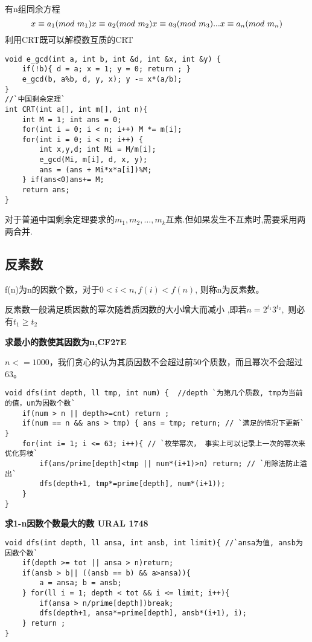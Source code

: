 有n组同余方程
$$
x \equiv a_1 (mod \ m_1) \\ x \equiv a_2 (mod \ m_2) \\ x \equiv a_3 (mod \ m_3) \\ ... \\ x \equiv a_n (mod \ m_n) \\ 
$$
利用CRT既可以解模数互质的CRT
\begin{lstlisting}
void e_gcd(int a, int b, int &d, int &x, int &y) {
    if(!b){ d = a; x = 1; y = 0; return ; }
    e_gcd(b, a%b, d, y, x); y -= x*(a/b);
}
//`中国剩余定理`
int CRT(int a[], int m[], int n){
    int M = 1; int ans = 0;
    for(int i = 0; i < n; i++) M *= m[i];
    for(int i = 0; i < n; i++) {
        int x,y,d; int Mi = M/m[i];
        e_gcd(Mi, m[i], d, x, y);
        ans = (ans + Mi*x*a[i])%M;
    } if(ans<0)ans+= M;
    return ans;
}
\end{lstlisting}
对于普通中国剩余定理要求的$m_1,m_2,…,m_k$互素.但如果发生不互素时,需要采用两两合并. 

\subsection{反素数}

f(n)为n的因数个数，对于$0<i<n,f(i) < f(n)$, 则称n为反素数。

反素数一般满足质因数的幂次随着质因数的大小增大而减小 ,即若$ n = 2^{t_1}3^{t_2},$ 则必有$t_1 \ge t_2$

{\bfseries 求最小的数使其因数为n,CF27E}

$n<=1000$，我们贪心的认为其质因数不会超过前50个质数，而且幂次不会超过63。

\begin{lstlisting}
void dfs(int depth, ll tmp, int num) {  //depth `为第几个质数, tmp为当前的值，um为因数个数`
    if(num > n || depth>=cnt) return ;
    if(num == n && ans > tmp) { ans = tmp; return; // `满足的情况下更新` } 
    for(int i= 1; i <= 63; i++){ // `枚举幂次， 事实上可以记录上一次的幂次来优化剪枝`
        if(ans/prime[depth]<tmp || num*(i+1)>n) return; // `用除法防止溢出`
        dfs(depth+1, tmp*=prime[depth], num*(i+1));
    }
}
\end{lstlisting}


{\bfseries 求1-n因数个数最大的数 URAL 1748}


\begin{lstlisting}
void dfs(int depth, ll ansa, int ansb, int limit){ //`ansa为值, ansb为因数个数`
    if(depth >= tot || ansa > n)return;
    if(ansb > b|| ((ansb == b) && a>ansa)){
        a = ansa; b = ansb;
    } for(ll i = 1; depth < tot && i <= limit; i++){
        if(ansa > n/prime[depth])break;
        dfs(depth+1, ansa*=prime[depth], ansb*(i+1), i);
    } return ;
}
\end{lstlisting}

